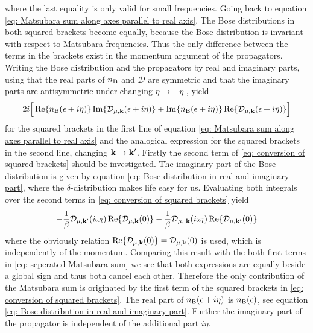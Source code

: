 %
where the last equality is only valid for small frequencies.
Going back to equation \eqref{eq: Matsubara sum along axes parallel to real axis}.
The Bose distributions in both squared brackets become equally, because the Bose distribution is invariant with respect to Matsubara frequencies.
Thus the only difference between the terms in the brackets exist in the momentum argument of the propagators.
Writing the Bose distribution and the propagators by real and imaginary parts, using that the real parts of $n_{\mathrm{B}}$ and $\mathcal{D}$ are symmetric and that the imaginary parts are antisymmetric under changing $\eta \to -\eta$ , yield
%
\begin{align}
	2i\Big[ \Re{n_{\mt{B}}(\epsilon+i\eta)} \Im{\mathcal{D}_{\mu, \vb{k}}(\epsilon+i\eta)} + \Im{n_{\mt{B}}(\epsilon+i\eta)} \Re{\mathcal{D}_{\mu, \vb{k}}(\epsilon+i\eta)} \Big]
	\label{eq: conversion of squared brackets}
\end{align}
%
for the squared brackets in the first line of equation \eqref{eq: Matsubara sum along axes parallel to real axis} and the analogical expression for the squared brackets in the second line, changing $\vb{k} \to \vb{k}'$.
Firstly the second term of \eqref{eq: conversion of squared brackets} should be investigated.
The imaginary part of the Bose distribution is given by equation \eqref{eq: Bose distribution in real and imaginary part}, where the $\delta$-distribution makes life easy for us.
Evaluating both integrals over the second terms in \eqref{eq: conversion of squared brackets} yield
%
\begin{align}
	-\frac{1}{\beta} \mathcal{D}_{\mu,\vb{k}'}(i\omega_{l}) \Re{\mathcal{D}_{\mu,\vb{k}}(0)} - \frac{1}{\beta} \mathcal{D}_{\mu,,\vb{k}}(i\omega_{l}) \Re{\mathcal{D}_{\mu,\vb{k}'}(0)}
\end{align}
%
where the obviously relation $\Re{\mathcal{D}_{\mu,\vb{k}}(0)} = \mathcal{D}_{\mu,\vb{k}}(0)$ is used, which is independently of the momentum.
Comparing this result with the both first terms in \eqref{eq: seperated Matsubara sum} we see that both expressions are equally beside a global sign and thus both cancel each other.
Therefore the only contribution of the Matsubara sum is originated by the first term of the squared brackets in \eqref{eq: conversion of squared brackets}.
The real part of $n_{\mathrm{B}}(\epsilon + i\eta)$ is $n_{\mathrm{B}}(\epsilon)$, see equation \eqref{eq: Bose distribution in real and imaginary part}.
Further the imaginary part of the propagator is independent of the additional part $i\eta$. %
